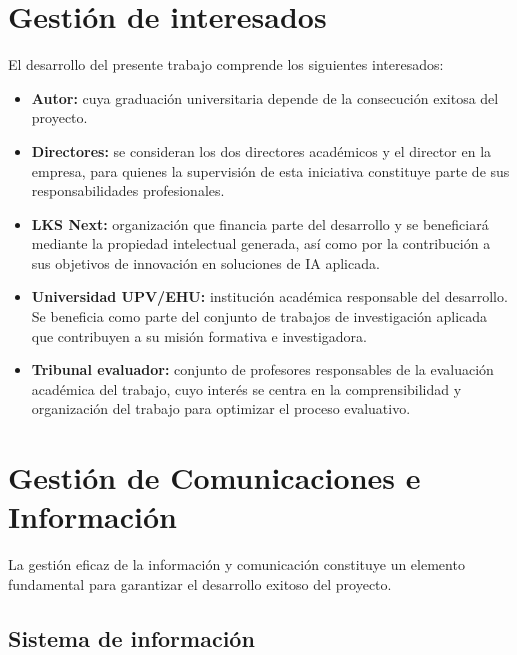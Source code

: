 \section{Gestión de interesados}
El desarrollo del presente trabajo comprende los siguientes interesados: 
\begin{itemize}
  \item \textbf{Autor: }cuya graduación universitaria depende de la consecución exitosa del proyecto.
  \item \textbf{Directores: }se consideran los dos directores académicos y el director en la empresa, para quienes la supervisión de esta iniciativa constituye parte de sus responsabilidades profesionales.  
\item \textbf{LKS Next: }organización que financia parte del desarrollo y se beneficiará mediante la propiedad intelectual generada, así como por la contribución a sus objetivos de innovación en soluciones de IA aplicada.
  \item \textbf{Universidad UPV/EHU: }institución académica responsable del desarrollo. Se beneficia como parte del conjunto de trabajos de investigación aplicada que contribuyen a su misión formativa e investigadora.
  \item \textbf{Tribunal evaluador: }conjunto de profesores responsables de la evaluación académica del trabajo, cuyo interés se centra en la comprensibilidad y organización del trabajo para optimizar el proceso evaluativo.
\end{itemize}

\section{Gestión de Comunicaciones e Información}
La gestión eficaz de la información y comunicación constituye un elemento fundamental para garantizar el desarrollo exitoso del proyecto.

\subsection{Sistema de información}\label{sec:sys_info}


